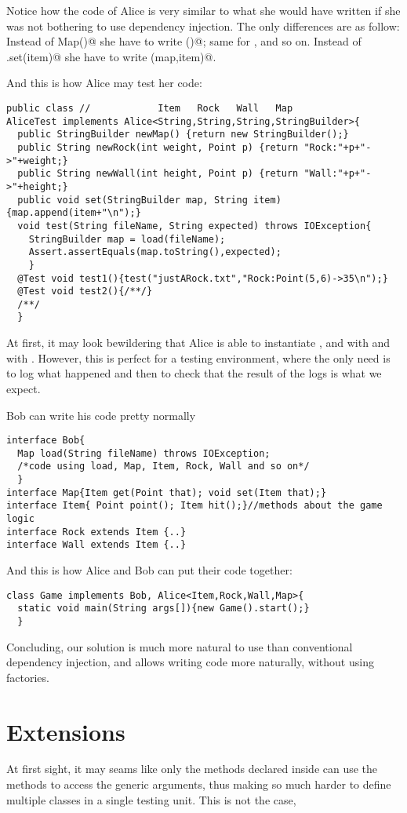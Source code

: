 \documentclass[submission,copyright,creativecommons]{eptcs}
\begin{document}
Notice how the code of Alice is very similar to what she would have written
if she was not bothering to use dependency injection. The
only differences are as follow:
Instead of \Q@new Map()@ she have to write \Q@newMap()@; same for
\Q@Rock@, \Q@Wall@ and so on.
Instead of \Q@map.set(item)@ she have to write \Q@set(map,item)@.

And this is how Alice may test her code:
\begin{lstlisting}
public class //            Item   Rock   Wall   Map
AliceTest implements Alice<String,String,String,StringBuilder>{
  public StringBuilder newMap() {return new StringBuilder();}
  public String newRock(int weight, Point p) {return "Rock:"+p+"->"+weight;}
  public String newWall(int height, Point p) {return "Wall:"+p+"->"+height;}
  public void set(StringBuilder map, String item) {map.append(item+"\n");}
  void test(String fileName, String expected) throws IOException{
    StringBuilder map = load(fileName);
    Assert.assertEquals(map.toString(),expected);
    }
  @Test void test1(){test("justARock.txt","Rock:Point(5,6)->35\n");}
  @Test void test2(){/**/}
  /**/
  }
\end{lstlisting}
At first, it may look bewildering that Alice is able to instantiate
\Q@Item@, \Q@Rock@ and \Q@Wall@ with \Q@String@ and \Q@Map@ with
\Q@StringBuilder@. However, this is perfect for a testing environment, where
the only need is to log what happened and then to check that the result
of the logs is what we expect.

Bob can write his code pretty normally
\begin{lstlisting}
interface Bob{
  Map load(String fileName) throws IOException;
  /*code using load, Map, Item, Rock, Wall and so on*/
  }
interface Map{Item get(Point that); void set(Item that);}
interface Item{ Point point(); Item hit();}//methods about the game logic
interface Rock extends Item {..}
interface Wall extends Item {..}
\end{lstlisting}
And this is how Alice and Bob can put their code together:

\begin{lstlisting}
class Game implements Bob, Alice<Item,Rock,Wall,Map>{
  static void main(String args[]){new Game().start();}
  }
\end{lstlisting}


Concluding, our solution is much more natural to use than conventional dependency injection,
and allows writing code more naturally, without using factories.

\section{Extensions}
At first sight, it may seams like only the methods declared
inside \Q@Alice@ can use the methods to access the generic arguments,
thus making so much harder to define multiple classes in a single
testing unit.
This is not the case, 
\end{document}
